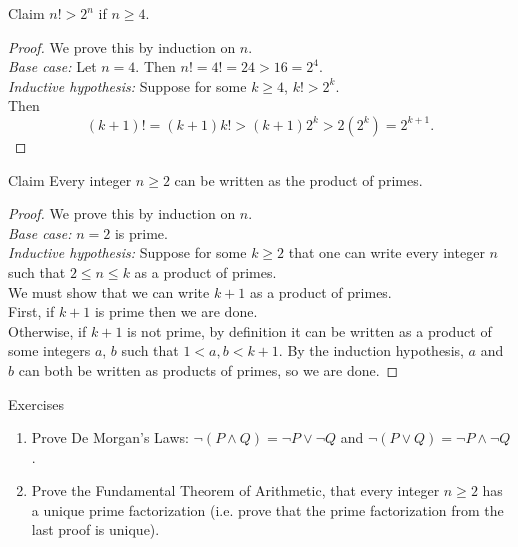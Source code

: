 \documentclass [aspectratio=169]{beamer}
\begin{document}
\begin{frame}
\begin{exampleblock}{Claim}
$n! > 2^n$ if $n \geq 4$.
\end{exampleblock}


\begin{proof}
We prove this by induction on $n$. \\
{\it Base case:} Let $n = 4$. Then $n! = 4! = 24 > 16 = 2^4$. \\
\pause
{\it Inductive hypothesis:} Suppose for some $k \geq 4$, $k! > 2^k$. \\
\pause
Then
$$(k+1)! = (k+1) k! > (k+1) 2^k > 2 (2^k) = 2^{k+1}.$$
\end{proof}
\end{frame}



\begin{frame}
\begin{exampleblock}{Claim}
Every integer $n \geq 2$ can be written as the product of primes.
\end{exampleblock}

\begin{proof}
We prove this by induction on $n$. \\
{\it Base case:} $n = 2$ is prime. \\
\pause
{\it Inductive hypothesis:} Suppose for some $k \geq 2$ that one can write every integer $n$ such that $2 \leq n \leq k$ as a product of primes. \\
\pause
We must show that we can write $k+1$ as a product of primes. \\
First, if $k+1$ is prime then we are done.  \\
\pause
Otherwise, if $k+1$ is not prime, by definition it can be written as a product of some integers $a$, $b$ such that $1 < a,b < k+1$. 
By the induction hypothesis, $a$ and $b$ can both be written as products of primes, so we are done.
\end{proof}

\end{frame}


\begin{frame}{Exercises}
\begin{enumerate}
\item Prove De Morgan's Laws: $\neg (P \wedge Q) = \neg P \vee \neg Q$ and $\neg (P \vee Q) = \neg P \wedge \neg Q$ .
\item Prove the Fundamental Theorem of Arithmetic, that every integer $n \geq 2$ has a unique prime factorization (i.e. prove that the prime factorization from the last proof is unique).
\end{enumerate}


\end{frame}
\end{document}
